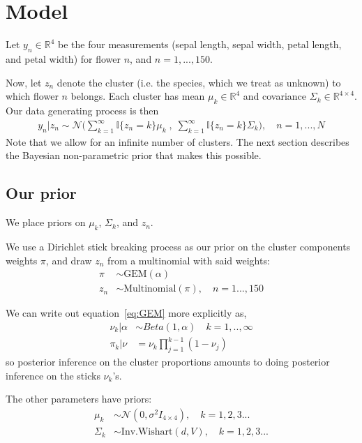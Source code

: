 \documentclass[a4paper]{article}
\begin{document}
\section{Model}
Let $y_{n}\in \mathbb{R}^4$ be the four measurements
(sepal length, sepal width, petal length, and petal width)
for flower $n$, and $n = 1, ..., 150$.

Now, let $z_n$ denote the cluster (i.e. the species, which we treat as unknown)
to which flower $n$ belongs.
Each cluster has mean $\mu_k\in \mathbb{R}^4$  and covariance $\Sigma_k \in \mathbb{R}^{4\times 4}$.
Our data generating process is then
\begin{align}
	y_n | z_n \sim \mathcal{N}\Big(\sum_{k=1}^\infty \mathbb{I}\{z_n = k\} \mu_k \;,
              \; \sum_{k=1}^\infty \mathbb{I}\{z_n = k\} \Sigma_k\Big),
	\quad n = 1, ..., N
\end{align}
Note that we allow for an infinite number of clusters. The next section describes
the Bayesian non-parametric prior that makes this possible.

\subsection{Our prior}
We place priors on $\mu_k$, $\Sigma_k$, and $z_n$. \par

We use a Dirichlet stick breaking process \cite{dp_prior} as our prior on the cluster components
weights $\pi$, and draw $z_n$ from a multinomial with said weights:
\begin{align}
	\pi &\sim \text{GEM}(\alpha) \label{eq:GEM} \\
	 z_n &\sim \text{Multinomial}(\pi), \quad n = 1..., 150
\end{align}

We can write out equation~\ref{eq:GEM} more explicitly as,
\begin{align}
  \nu_k | \alpha &\sim Beta(1, \alpha) \quad k = 1, .., \infty \label{eq:beta_sticks}\\
  \pi_k | \nu &= \nu_k \prod_{j=1}^{k-1} (1 - \nu_j) \label{eq:stick_breaking}
\end{align}
so posterior inference on the cluster proportions amounts to doing
posterior inference on the sticks $\nu_k$'s.

The other parameters have priors:
\begin{align}
	\mu_k &\sim \mathcal{N}(0, \sigma^2 I_{4\times 4}), \quad k = 1, 2, 3 ... \\
	\Sigma_k &\sim \text{Inv.Wishart}(d, V), \quad k = 1, 2, 3 ...
\end{align}
\end{document}
